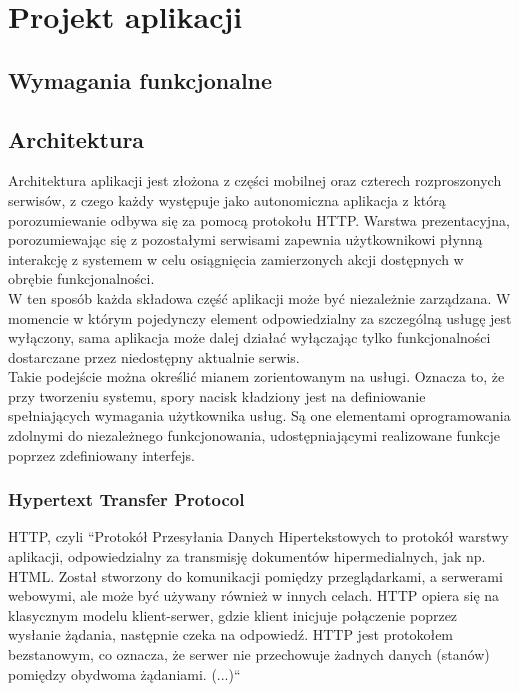 \chapter{Projekt aplikacji}

\section{Wymagania funkcjonalne}

\newpage
\section{Architektura}

Architektura aplikacji jest złożona z części mobilnej oraz czterech rozproszonych serwisów, z czego każdy występuje jako autonomiczna aplikacja z którą porozumiewanie odbywa się za pomocą protokołu HTTP. Warstwa prezentacyjna, porozumiewając się z pozostałymi serwisami zapewnia użytkownikowi płynną interakcję z systemem w celu osiągnięcia zamierzonych akcji dostępnych w obrębie funkcjonalności.\\
W ten sposób każda składowa część aplikacji może być niezależnie zarządzana. W momencie w którym pojedynczy element odpowiedzialny za szczególną usługę jest wyłączony, sama aplikacja może dalej działać wyłączając tylko funkcjonalności dostarczane przez niedostępny aktualnie serwis.\\
\linebreak
Takie podejście można określić mianem zorientowanym na usługi. Oznacza to, że przy tworzeniu systemu, spory nacisk kładziony jest na definiowanie spełniających wymagania użytkownika usług. Są one elementami oprogramowania zdolnymi do niezależnego funkcjonowania, udostępniającymi realizowane funkcje poprzez zdefiniowany interfejs.

\subsection{Hypertext Transfer Protocol}
HTTP, czyli ``Protokół Przesyłania Danych Hipertekstowych to protokół warstwy aplikacji, odpowiedzialny za transmisję dokumentów hipermedialnych, jak np. HTML. Został stworzony do komunikacji pomiędzy przeglądarkami, a serwerami webowymi, ale może być używany również w innych celach. HTTP opiera się na klasycznym modelu klient-serwer, gdzie klient inicjuje połączenie poprzez wysłanie żądania, następnie czeka na odpowiedź. HTTP jest protokołem bezstanowym, co oznacza, że serwer nie przechowuje żadnych danych (stanów) pomiędzy obydwoma żądaniami. (...)``\cite{http}
\linebreak

